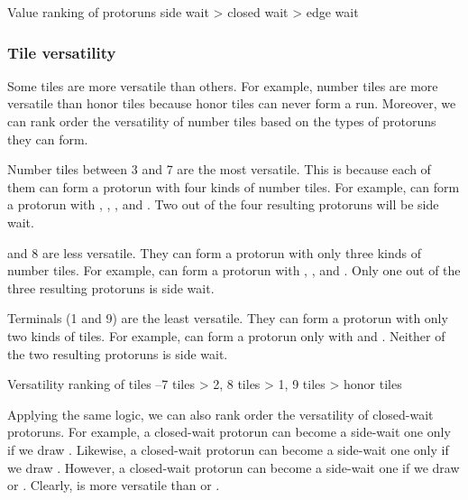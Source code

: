 {\bigskip

\color{MyRed}
\begin{itembox}[c]{Value ranking of protoruns}
\normalcolor
\centering
side wait > closed wait > edge wait
\end{itembox}
\normalcolor

\bigskip

\subsubsection{Tile versatility} \label{sec:versatility}

Some tiles are more versatile than others. 
For example, number tiles are more versatile than honor tiles because honor tiles can never form a run. Moreover, we can rank order the versatility of number tiles based on the types of protoruns they can form.

\bigskip
Number tiles between 3 and 7 are the most versatile. This is because each of them can form a protorun with four kinds of number tiles. For example, {\LARGE{}} can form a protorun with {\LARGE{}}, {\LARGE{}}, {\LARGE{}}, and {\LARGE{}}. Two out of the four resulting protoruns will be side wait.

 and 8 are less versatile. They can form a protorun with only three kinds of number tiles. For example, {\LARGE{}} can form a protorun with {\LARGE{}}, {\LARGE{}}, and {\LARGE{}}. Only one out of the three resulting protoruns is side wait. 

\bigskip
Terminals (1 and 9) are the least versatile. They can form a protorun with only two kinds of tiles. For example, {\LARGE{}} can form a protorun only with {\LARGE{}} and {\LARGE{}}. Neither of the two resulting protoruns is side wait. 

\color{MyRed}
\begin{itembox}[c]{Versatility ranking of tiles}
\centering{}--7 tiles > 2, 8 tiles > 1, 9 tiles > honor tiles
\end{itembox}
\normalcolor
\bigskip
Applying the same logic, we can also rank order the versatility of closed-wait protoruns. 
For example, a closed-wait protorun {\LARGE{}} can become a side-wait one only if we draw {\LARGE{}}. Likewise, a closed-wait protorun {\LARGE{}} can become a side-wait one only if we draw {\LARGE{}}. However, a closed-wait protorun {\LARGE{}} can become a side-wait one if we draw {\LARGE{}} or {\LARGE{}}. Clearly, {\LARGE{}} is more versatile than {\LARGE{}} or {\LARGE{}}. 

}

